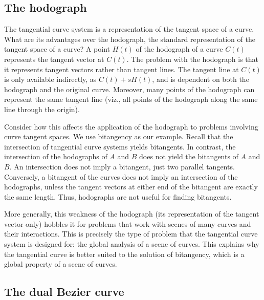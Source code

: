\documentclass[12pt]{article}
\begin{document}

\subsection{The hodograph}
\label{sec:hodo}

The tangential curve system is a representation of the tangent space of a curve.
What are its advantages over the hodograph, the standard representation of 
the tangent space of a curve?
A point $H(t)$ of the hodograph of a curve $C(t)$ represents the tangent 
vector at $C(t)$.
The problem with the hodograph is that it represents tangent vectors rather
than tangent lines.
The tangent line at $C(t)$ is only available indirectly, as $C(t) + sH(t)$,
and is dependent on both the hodograph and the original curve.
Moreover, many points of the hodograph can represent the same 
tangent line (viz., all points of the hodograph along the same line through the origin).

Consider how this affects the application of the hodograph to problems
involving curve tangent spaces.
We use bitangency as our example.
Recall that the intersection of tangential curve systems yields bitangents.
In contrast, the intersection of the hodographs of $A$ and $B$ does not yield the 
bitangents of $A$ and $B$.
An intersection does not imply a bitangent, just two parallel tangents.
Conversely, a bitangent of the curves does not imply an intersection
of the hodographs, unless the tangent vectors at either end of the bitangent
are exactly the same length.
Thus, hodographs are not useful for finding bitangents.

More generally, this weakness of the hodograph (its representation of the tangent
vector only) hobbles it
for problems that work with scenes of many curves and their interactions.
This is precisely the type of problem 
that the tangential curve system is designed for:
the global analysis of a scene of curves.
This explains why the tangential curve is better suited to the solution of bitangency,
which is a global property of a scene of curves.


\subsection{The dual Bezier curve}
\label{sec:dualBezier}
\end{document}
